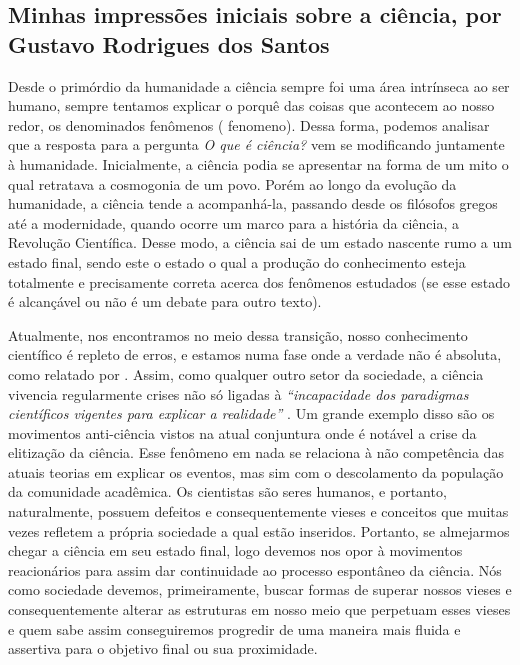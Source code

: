 \subsection{Minhas impressões iniciais sobre a ciência, por Gustavo Rodrigues dos Santos}
\label{chap:gutorsantos:impressoes-ciencia}

Desde o primórdio da humanidade a ciência sempre foi uma área intrínseca ao ser humano, sempre tentamos explicar o porquê das coisas que acontecem ao nosso redor, os denominados fenômenos ( \gls{fenomeno}). Dessa forma, podemos analisar que a resposta para a pergunta \textit{O que é ciência?} vem se modificando juntamente à humanidade. Inicialmente, a ciência podia se apresentar na forma de um mito o qual retratava a cosmogonia de um povo. Porém ao longo da evolução da humanidade, a ciência tende a acompanhá-la, passando desde os filósofos gregos até a modernidade, quando ocorre um marco para a história da ciência, a Revolução Científica. Desse modo, a ciência sai de um estado nascente rumo a um estado final, sendo este o estado o qual a produção do conhecimento esteja totalmente e precisamente correta acerca dos fenômenos estudados (se esse estado é alcançável ou não é um debate para outro texto).

Atualmente, nos encontramos no meio dessa transição, nosso conhecimento científico é repleto de erros, e estamos numa fase onde a verdade não é absoluta, como relatado por \citet{fernandes_consideracoes_2021}. Assim, como qualquer outro setor da sociedade, a ciência vivencia regularmente crises não só ligadas à \textit{``incapacidade dos paradigmas científicos vigentes para explicar a realidade''} \citep{fernandes_consideracoes_2021}. Um grande exemplo disso são os movimentos anti-ciência vistos na atual conjuntura onde é notável a crise da elitização da ciência. Esse fenômeno em nada se relaciona à não competência das atuais teorias em explicar os eventos, mas sim com o descolamento da população da comunidade acadêmica. Os cientistas são seres humanos, e portanto, naturalmente, possuem defeitos e consequentemente vieses e conceitos que muitas vezes refletem a própria sociedade a qual estão inseridos. Portanto, se almejarmos chegar a ciência em seu estado final, logo devemos nos opor à movimentos reacionários para assim dar continuidade ao processo espontâneo da ciência. Nós como sociedade devemos, primeiramente, buscar formas de superar nossos vieses e consequentemente alterar as estruturas em nosso meio que perpetuam esses vieses e quem sabe assim conseguiremos progredir de uma maneira mais fluida e assertiva para o objetivo final ou sua proximidade.
